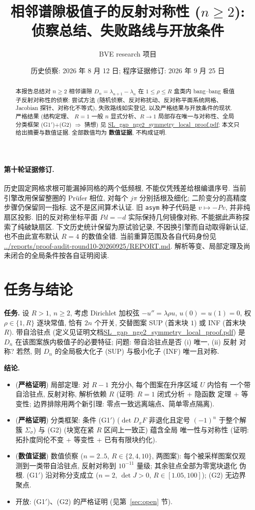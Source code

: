 \documentclass[UTF8]{ctexart}
\title{相邻谱隙极值子的反射对称性 ($n\ge2$):\\ 侦察总结、失败路线与开放条件}
\author{BVE research 项目}
\date{历史侦察: 2026 年 8 月 12 日; 程序证据修订: 2026 年 9 月 25 日}
\newcommand{\STRICT}{\textbf{严格证明}}
\newcommand{\EVIDENCE}{\textbf{数值证据}}
\begin{document}
\maketitle

\begin{abstract}
本报告总结对 $n\ge2$ 相邻谱隙 $D_n=\lambda_{n+1}-\lambda_n$ 在
$1\le\rho\le R$ 盒类内 bang--bang 极值子反射对称性的侦察: 尝试方法
(随机侦察、反对称扰动、反对称平面系统网格、Jacobian 探针、对称化不等式),
失败路线如实登记, 以及严格结果与开放条件的现状. 严格结果 (结构定理、
$R=1$ 一般 $n$ 显式分析、$R\to1$ 局部存在唯一与对称性、全局分类框架
(G1$'$)+(G2) $\Rightarrow$ 猜想) 见
\url{SL_gap_nge2_symmetry_local_proof.pdf}; 本文只给出摘要与数值证据.
全部数值均为 \EVIDENCE, 不构成证明.
\end{abstract}

\paragraph{第十轮证据修订.}
历史固定网格求根可能漏掉同格的两个低频根, 不能仅凭残差给根编谱序号.
当前引擎改用保留整圈的 Pr\"ufer 相位, 对每个 $j\pi$ 分别括根及细化;
二阶变分的高精度步骤仍保留同一指标. 这不是区间算术认证.
旧 \texttt{asym} 种子代码是 $v\mapsto-Pv$, 并非纯扇区投影.
旧的反对称坐标平面 $Pd=-d$ 实际保持几何镜像对称, 不能据此声称探索了纯破缺扇区.
下文历史统计保留为原试验记录, 不因换引擎而自动取得新认证, 也不由此宣布默认
$R=4$ 的数值全错. 当前重算范围及各自代码身份见
\url{../reports/proof-audit-round10-20260925/REPORT.md}.
解析等变、局部定理及尚未闭合的全局条件按各自证明阅读.

\section{任务与结论}

\textbf{任务.} 设 $R>1$, $n\ge2$, 考虑 Dirichlet 加权弦 $-u''=\lambda\rho u$,
$u(0)=u(1)=0$, 权 $\rho\in\{1,R\}$ 逐块常值, 恰有 $2n$ 个开关, 交替图案 SUP
(首末块 $1$) 或 INF (首末块 $R$). 带自洽驻点 (定义见证明文档\url{SL_gap_nge2_symmetry_local_proof.pdf}) 是
$D_n$ 在该图案族内极值子的必要特征; 问题: 带自洽驻点是否 (i) 唯一, (ii) 反射
对称? 若然, 则 $D_n$ 的全局极大化子 (SUP) 与极小化子 (INF) 唯一且对称.

\textbf{结论.}
\begin{itemize}
	\item (\STRICT) 局部定理: 对 $R-1$ 充分小, 每个图案在升序区域 $U$ 内恰有
	一个带自洽驻点, 反射对称, 解析依赖 $R$ (证明: $R=1$ 闭式分析 + 隐函数
	定理 + 等变性; 边界排除用两个新引理: 零点一致远离端点、简单零点隔离).
	\item (\STRICT) 分类框架: 条件 (G1$'$) ($\det D_xF$ 非退化且定号 $(-1)^n$
	于整个解簇 $\Sigma_\sigma$) 与 (G2) (块宽在紧 $R$ 区间上一致正) 蕴含全局
	唯一性与对称性 (证明: 拓扑度同伦不变 + 等变性 + 已有有限块约化).
	\item (\EVIDENCE) 数值侦察 ($n=2..5$, $R\in\{2,4,10\}$, 两图案): 每个被采样图案仅观测到一类带自洽驻点, 反射对称到 $10^{-11}$ 量级; 其余驻点全部为零宽块退化
	伪根. (G1$'$) 沿对称分支成立 ($n=2$, $\det J>0$, $R\in[1.05,100]$);
	(G2) 无边界聚点.
	\item 开放: (G1$'$)、(G2) 的严格证明 (见第~\ref{sec:open} 节).
\end{itemize}
\end{document}
